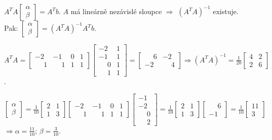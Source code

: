 $A^T A 
\begin{bmatrix}
    \alpha \\
    \beta
\end{bmatrix} = A^T b$. $A$ má lineárně nezávislé sloupce $\Rightarrow$ $(A^T A)^{-1}$ existuje.\\
Pak: $
\begin{bmatrix}
    \alpha \\
    \beta    
\end{bmatrix} = (A^TA)^{-1} A^Tb$.

$A^T A = 
\begin{bmatrix}
    -2 & -1 & 0 & 1 \\
    \phantom{-}1 & \phantom{-}1 & 1 & 1
\end{bmatrix}
\begin{bmatrix}
    -2 & 1 \\
    -1 & 1 \\
    \phantom{-}0 & 1 \\
    \phantom{-}1 & 1 
\end{bmatrix} = 
\begin{bmatrix}
    \phantom{-}6 & -2 \\
    -2 & \phantom{-}4
\end{bmatrix} \Rightarrow (A^T A)^{-1} = \frac{1}{20}
\begin{bmatrix}
    4 & 2 \\
    2 & 6
\end{bmatrix}$.

$\begin{bmatrix}
    \alpha \\
    \beta
\end{bmatrix} = \frac{1}{10}
\begin{bmatrix}
    2 & 1 \\
    1 & 3
\end{bmatrix}
\begin{bmatrix}
    -2 & -1 & 0 & 1 \\
    \phantom{-}1 & \phantom{-}1 & 1 & 1
\end{bmatrix}
\begin{bmatrix}
    -1 \\
    -2 \\
    \phantom{-}0 \\
    \phantom{-}2
\end{bmatrix} = \frac{1}{10}
\begin{bmatrix}
    2 & 1 \\
    1 & 3
\end{bmatrix}
\begin{bmatrix}
    \phantom{-}6 \\
    -1
\end{bmatrix} = \frac{1}{10}
\begin{bmatrix}
    11 \\
    3
\end{bmatrix}$
$\Rightarrow \alpha = \frac{11}{10}$; $\beta = \frac{3}{10}$.

